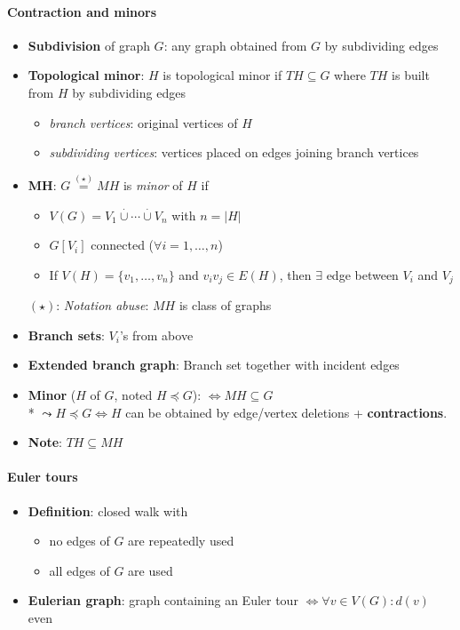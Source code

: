 \paragraph{Contraction and minors}
\begin{itemize}
  \item \textbf{Subdivision} of graph $ G $: any graph obtained from $ G $ by subdividing edges
  \item \textbf{Topological minor}: $ H $ is topological minor if $ TH \subseteq G $ where $ TH $ is built from $ H $ by subdividing edges
  \begin{itemize}
    \item \emph{branch vertices}: original vertices of $ H $
    \item \emph{subdividing vertices}: vertices placed on edges joining branch vertices
  \end{itemize}
  \item \textbf{MH}: $ G \overset{(\star)}{=} MH $ is \emph{minor} of $ H $ if
  \begin{itemize}
    \item $ V(G) = V_1 \overset{\cdot}{\cup} \cdots \overset{\cdot}{\cup} V_n $ with $ n = \vert H \vert $
    \item $ G[V_i] $ connected ($ \forall i = 1, \dots, n $)
    \item If $ V(H) = \{ v_1, \dots, v_n \} $ and $ v_iv_j \in E(H) $, then $ \exists $ edge between $ V_i $ and $ V_j $
  \end{itemize}
  $ (\star) $: \emph{Notation abuse}: $ MH $ is class of graphs
  \item \textbf{Branch sets}: $ V_i $'s from above
  \item \textbf{Extended branch graph}: Branch set together with incident edges
  \item \textbf{Minor} ($ H $ of $ G $, noted $ H \preccurlyeq G $): $ \Leftrightarrow MH \subseteq G $ \\*
    $ \leadsto H \preccurlyeq G \Leftrightarrow H $ can be obtained by edge/vertex deletions + \textbf{contractions}.
  \item \textbf{Note}: $ TH \subseteq MH $
\end{itemize}

\paragraph{Euler tours}
\begin{itemize}
  \item \textbf{Definition}: closed walk with
  \begin{itemize}
    \item no edges of $ G $ are repeatedly used
    \item all edges of $ G $ are used 
  \end{itemize}
  \item \textbf{Eulerian graph}: graph containing an Euler tour $ \Leftrightarrow \forall v \in V(G) : d(v) $ even 
\end{itemize}

